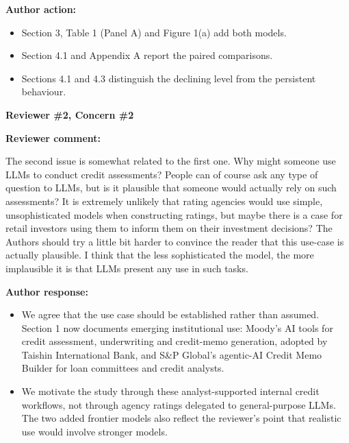 \documentclass[11pt]{article}
\newcommand{\rvcomment}[1]{{\color{ReviewerGreen}#1}}
\newcommand{\concern}[1]{\textbf{\color{ReviewerGreen}#1}}
\begin{document}
\textbf{Author action:}

\begin{itemize}

\item Section 3, Table 1 (Panel A) and Figure 1(a) add both models.

\item Section 4.1 and Appendix A report the paired comparisons.

\item Sections 4.1 and 4.3 distinguish the declining level from the persistent behaviour.

\end{itemize}

\vspace{12pt}
\concern{Reviewer \#2, Concern \#2}

\concern{Reviewer comment:}

\rvcomment{The second issue is somewhat related to the first one. Why might someone use LLMs to conduct credit assessments? People can of course ask any type of question to LLMs, but is it plausible that someone would actually rely on such assessments? It is extremely unlikely that rating agencies would use simple, unsophisticated models when constructing ratings, but maybe there is a case for retail investors using them to inform them on their investment decisions? The Authors should try a little bit harder to convince the reader that this use-case is actually plausible. I think that the less sophisticated the model, the more implausible it is that LLMs present any use in such tasks.}

\textbf{Author response:}

\begin{itemize}

\item We agree that the use case should be established rather than assumed. Section 1 now documents emerging institutional use: Moody's AI tools for credit assessment, underwriting and credit-memo generation, adopted by Taishin International Bank, and S\&P Global's agentic-AI Credit Memo Builder for loan committees and credit analysts.

\item We motivate the study through these analyst-supported internal credit workflows, not through agency ratings delegated to general-purpose LLMs. The two added frontier models also reflect the reviewer's point that realistic use would involve stronger models.

\end{itemize}
\end{document}
